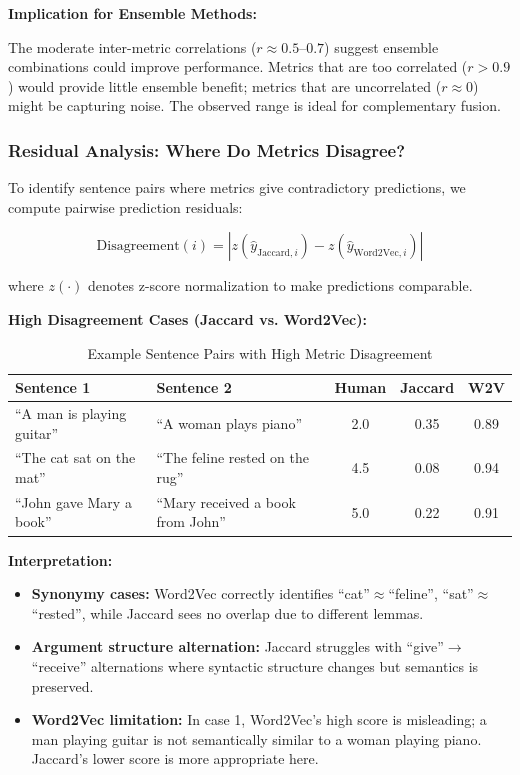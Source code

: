 \documentclass[11pt,a4paper]{article}
\begin{document}
\textbf{Implication for Ensemble Methods:}

The moderate inter-metric correlations ($r \approx 0.5$--$0.7$) suggest ensemble combinations could improve performance. Metrics that are too correlated ($r > 0.9$) would provide little ensemble benefit; metrics that are uncorrelated ($r \approx 0$) might be capturing noise. The observed range is ideal for complementary fusion.

\subsubsection{Residual Analysis: Where Do Metrics Disagree?}

To identify sentence pairs where metrics give contradictory predictions, we compute pairwise prediction residuals:

\begin{equation}
\text{Disagreement}(i) = |z(\hat{y}_{\text{Jaccard},i}) - z(\hat{y}_{\text{Word2Vec},i})|
\end{equation}

where $z(\cdot)$ denotes z-score normalization to make predictions comparable.

\textbf{High Disagreement Cases (Jaccard vs. Word2Vec):}

\begin{table}[h]
\centering
\caption{Example Sentence Pairs with High Metric Disagreement}
\begin{tabular}{p{4.5cm}p{4.5cm}ccc}
\toprule
\textbf{Sentence 1} & \textbf{Sentence 2} & \textbf{Human} & \textbf{Jaccard} & \textbf{W2V} \\
\midrule
``A man is playing guitar'' & ``A woman plays piano'' & 2.0 & 0.35 & 0.89 \\
``The cat sat on the mat'' & ``The feline rested on the rug'' & 4.5 & 0.08 & 0.94 \\
``John gave Mary a book'' & ``Mary received a book from John'' & 5.0 & 0.22 & 0.91 \\
\bottomrule
\end{tabular}
\end{table}

\textbf{Interpretation:}

\begin{itemize}
    \item \textbf{Synonymy cases:} Word2Vec correctly identifies ``cat''$\approx$``feline'', ``sat''$\approx$``rested'', while Jaccard sees no overlap due to different lemmas.
    
    \item \textbf{Argument structure alternation:} Jaccard struggles with ``give''$\to$``receive'' alternations where syntactic structure changes but semantics is preserved.
    
    \item \textbf{Word2Vec limitation:} In case 1, Word2Vec's high score is misleading; a man playing guitar is not semantically similar to a woman playing piano. Jaccard's lower score is more appropriate here.
\end{itemize}
\end{document}
